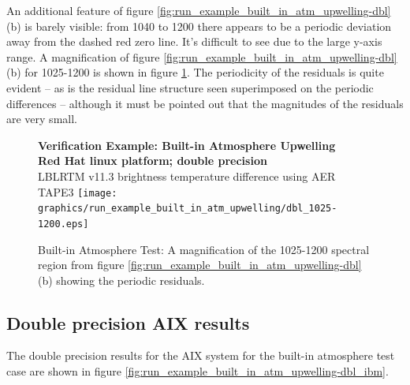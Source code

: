An additional feature of figure \ref{fig:run_example_built_in_atm_upwelling-dbl}(b) is barely visible: from 1040 to 1200\invcm{} there appears to be a periodic deviation away from the dashed red zero line. It's difficult to see due to the large y-axis range. A magnification of figure \ref{fig:run_example_built_in_atm_upwelling-dbl}(b) for 1025-1200\invcm{} is shown in figure \ref{fig:run_example_built_in_atm_upwelling-dbl_1025-1200}. The periodicity of the residuals is quite evident -- as is the residual line structure seen superimposed on the periodic differences -- although it must be pointed out that the magnitudes of the residuals are very small.

\begin{figure}[htp]
  \centering
  \qquad\sffamily\textbf{Verification Example: Built-in Atmosphere Upwelling}\\
  \qquad\sffamily\textbf{Red Hat linux platform; double precision}\\
  \qquad\textsf{LBLRTM v11.3 brightness temperature difference using AER TAPE3}
  \texttt{[image: graphics/run\_example\_built\_in\_atm\_upwelling/dbl\_1025-1200.eps]}
  \caption{Built-in Atmosphere Test: A magnification of the 1025-1200\invcm{} spectral region from figure \ref{fig:run_example_built_in_atm_upwelling-dbl}(b) showing the periodic residuals.}
  \label{fig:run_example_built_in_atm_upwelling-dbl_1025-1200}
\end{figure}


\subsection{Double precision AIX results}
The double precision results for the AIX system for the built-in atmosphere test case are shown in figure \ref{fig:run_example_built_in_atm_upwelling-dbl_ibm}.

